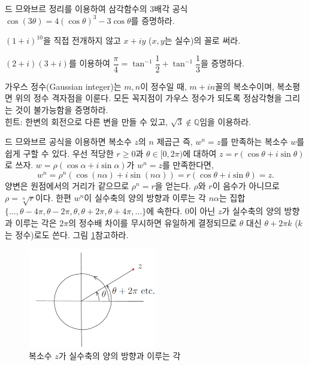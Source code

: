 \begin{salt_exercise} \label{ex-1-5}
드 므와브르 정리를 이용하여
삼각함수의 3배각 공식 $\cos (3\theta) = 4(\cos\theta)^3 - 3\cos\theta$를 증명하라.
\end{salt_exercise}

\begin{salt_exercise} \label{ex-1-6}
$(1+i)^{10}$을 직접 전개하지 않고 $x+iy$ ($x,y$는 실수)의 꼴로 써라.
\end{salt_exercise}

\begin{salt_exercise} \label{ex-1-7}
$(2+i)(3+i)$를 이용하여
$\dfrac\pi4 = \tan^{-1}\dfrac12 + \tan^{-1}\dfrac13$을 증명하다.
\end{salt_exercise}

\begin{salt_exercise} \label{ex-1-8}
가우스 정수(Gaussian integer)는 
$m, n$이 정수일 때, $m+in$꼴의 복소수이며,
복소평면 위의 정수 격자점을 이룬다.
모든 꼭지점이 가우스 정수가 되도록 정삼각형을 그리는 것이 불가능함을 증명하라. \\[1ex]
힌트: 한변의 회전으로 다른 변을 만들 수 있고, $\sqrt{3}\not\in \mathbb Q$임을 이용하라.
\end{salt_exercise}

드 므와브르 공식을 이용하면
복소수  $z$의 $n$ 제곱근
즉, $w^n=z$를 만족하는 복소수 $w$를 쉽게 구할 수 있다.
우선 적당한 $r\ge0$과 $\theta\in[0,2\pi)$에 대하여 $z=r(\cos\theta + i \sin\theta)$로 쓰자.
$w= \rho(\cos\alpha + i\sin\alpha)$가 $w^n=z$를 만족한다면,
$$
w^n = \rho^n\left( \cos(n\alpha) + i\sin(n\alpha)\right) = r(\cos\theta + i\sin\theta)= z.
$$
양변은 원점에서의 거리가 같으므로 $\rho^n=r$을 얻는다.
$\rho$와 $r$이 음수가 아니므로 $\rho = \sqrt[n]{r}$이다.
한편 $w^n$이 실수축의 양의 방향과 이루는 각 $n\alpha$는 
집합 $ \{ \ldots, \theta - 4\pi, \theta - 2\pi, \theta, \theta+2\pi, \theta+4\pi, \ldots\} $에 속한다.
$0$이 아닌 $z$가 실수축의 양의 방향과 이루는 각은 $2\pi$의 정수배 차이를 무시하면 유일하게 결정되므로
$\theta$ 대신 $\theta + 2\pi k$ ($k$는 정수)로도 쓴다. 그림 \ref{fig-1-7}\을 참고하라.

\begin{figure}[!h]
\begin{center}
\includegraphics[width=0.5\textwidth]{./SaltChapter/figs/fig-1-7}
\end{center}
\caption{복소수 $z$가 실수축의 양의 방향과 이루는 각}
\label{fig-1-7}
\end{figure}

